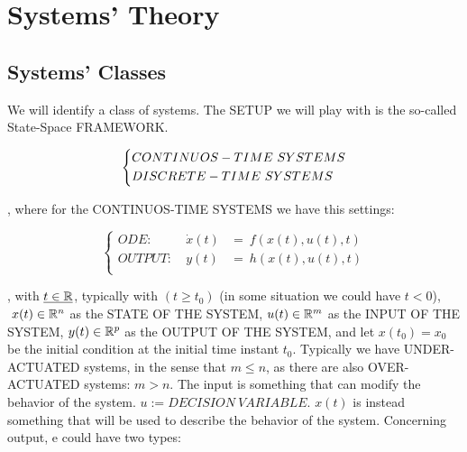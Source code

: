 
\chapter{Systems' Theory}
\label{cap:systheory}

\section{Systems' Classes}

We will identify a class of systems. The SETUP we will play with is the so-called State-Space FRAMEWORK. 

\begin{equation}
\left\{
\begin{aligned}
& CONTINUOS-TIME\ SYSTEMS \\
& DISCRETE-TIME\ SYSTEMS \\
\end{aligned} \\
\right.
\end{equation}

, where for the CONTINUOS-TIME SYSTEMS we have this settings:

\begin{equation}
\left\{
\begin{aligned}
ODE:\ &\dot{x}(t) &=\ f(x(t),u(t),t) \\
OUTPUT:\ &y(t) &=\ h(x(t),u(t),t) \\
\end{aligned}
\right.
\end{equation}

, with $\underline{t \in \mathbb{R}}$, typically with $(t \geq t_0)$ (in some situation we could have $t < 0$), $\ x(t) \in \mathbb{R}^n$ as the STATE OF THE SYSTEM, $u(t) \in \mathbb{R}^m$ as the INPUT OF THE SYSTEM, $y(t) \in \mathbb{R}^p$ as the OUTPUT OF THE SYSTEM, and let $x(t_0) = x_0$ be the initial condition at the initial time instant $t_0$.
Typically we have UNDER-ACTUATED systems, in the sense that $m \leq n$, as there are also OVER-ACTUATED systems: $m > n$. The input is something that can modify the behavior of the system. $u := DECISION\ VARIABLE$. $x(t)$ is instead something that will be used to describe the behavior of the system. Concerning output, e could have two types:


